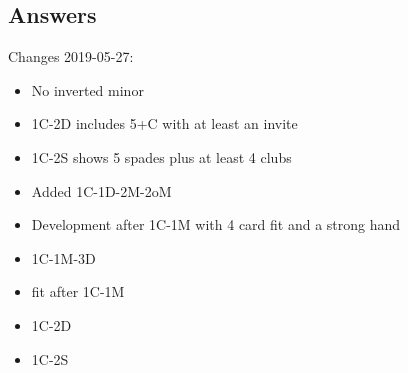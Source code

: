 \documentclass[a4paper]{article}
\begin{document}
\subsection{Answers}

Changes 2019-05-27:
\bigbreak
\begin{itemize}
\item No inverted minor

\item 1C-2D includes 5+C with at least an invite

\item 1C-2S shows 5 spades plus at least 4 clubs

\item Added 1C-1D-2M-2oM

\item Development after 1C-1M with 4 card fit and a strong hand

\item 1C-1M-3D

\item fit after 1C-1M

\item 1C-2D

\item 1C-2S

\end{itemize}
\bigbreak
\
\end{document}
